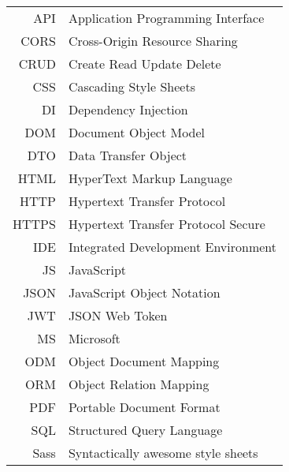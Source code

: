 \begin{longtable}{rl}
API & Application Programming Interface\\
CORS & Cross-Origin Resource Sharing\\
CRUD & Create Read Update Delete\\
CSS & Cascading Style Sheets\\
DI & Dependency Injection\\
DOM & Document Object Model\\
DTO & Data Transfer Object\\
HTML & HyperText Markup Language\\
HTTP & Hypertext Transfer Protocol\\
HTTPS & Hypertext Transfer Protocol Secure\\
IDE & Integrated Development Environment\\
JS & JavaScript\\
JSON & JavaScript Object Notation\\
JWT & JSON Web Token\\
MS & Microsoft\\
ODM & Object Document Mapping\\
ORM & Object Relation Mapping\\
PDF & Portable Document Format\\
SQL & Structured Query Language\\
Sass & Syntactically awesome style sheets\\

\end{longtable}
